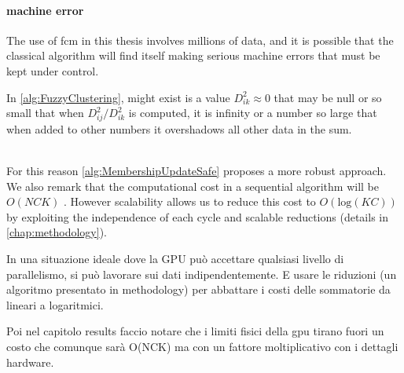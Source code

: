 \paragraph{machine error}
The use of \gls{fcm} in this thesis involves millions of data, and it is possible that the classical algorithm will find itself making serious machine errors that must be kept under control. \begin{modified} In \cref{alg:FuzzyClustering}, might exist is a value $D_{ik}^2 \approx 0$  that may be null or so small that when $D_{ij}^2 / D_{ik}^2$ is computed, it is infinity or a number so large that when added to other numbers it overshadows all other data in the sum.\end{modified}\\ For this reason \cref{alg:MembershipUpdateSafe} proposes a more robust approach. We also remark that the computational cost in a sequential algorithm will be $O(NCK)$ . However scalability allows us to reduce this cost to $O(\text{log}(KC))$ by exploiting the independence of each cycle and scalable reductions (details in \cref{chap:methodology}).\\
\begin{note}
	In una situazione ideale dove la GPU può accettare qualsiasi livello di parallelismo, si può  lavorare sui dati indipendentemente. E usare le riduzioni (un algoritmo presentato in methodology) per abbattare i costi delle sommatorie da lineari a logaritmici.

	Poi nel capitolo results faccio notare che i limiti fisici della gpu tirano fuori un costo che comunque sarà O(NCK) ma con un fattore moltiplicativo con i dettagli hardware.
\end{note}


